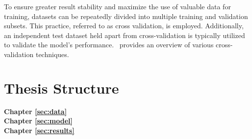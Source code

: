 To ensure greater result stability and maximize the use of valuable data for training, datasets can be repeatedly divided into multiple training and validation subsets. This practice, referred to as cross validation, is employed. Additionally, an independent test dataset held apart from cross-validation is typically utilized to validate the model's performance.~\cite{browne2000cv} provides an overview of various cross-validation techniques.

\section{Thesis Structure}
\label{sec:intro:structure}

\textbf{Chapter \ref{sec:data}} \\[0.2em]


\textbf{Chapter \ref{sec:model}} \\[0.2em]


\textbf{Chapter \ref{sec:results}} \\[0.2em]

